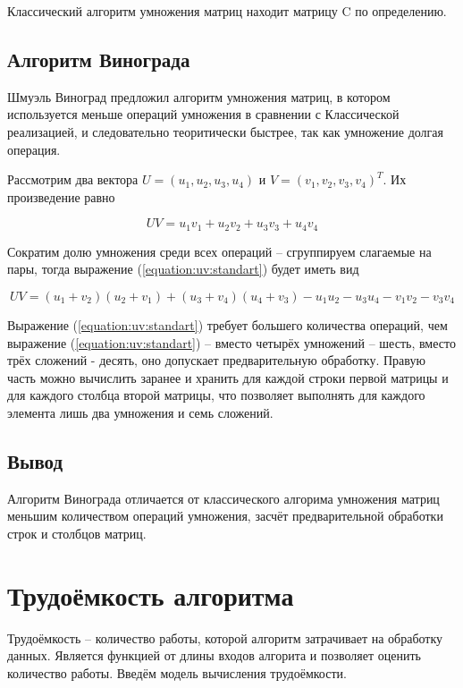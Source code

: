         Классический алгоритм умножения матриц находит матрицу C по определению.

        \subsection{Алгоритм Винограда}
        Шмуэль Виноград предложил алгоритм умножения матриц, в котором используется меньше операций умножения
        в сравнении с Классической реализацией, и следовательно теоритически быстрее, так как умножение долгая операция.

        Рассмотрим два вектора $ U = (u_1, u_2, u_3, u_4) $ и $ V = (v_1, v_2, v_3, v_4)^T $. Их произведение равно 

        \begin{equation}
            UV = u_1v_1 + u_2v_2 + u_3v_3 + u_4v_4
            \label{equation:uv:standart}
        \end{equation}

        Сократим долю умножения среди всех операций -- сгруппируем слагаемые на пары, тогда выражение (\ref{equation:uv:standart}) будет иметь вид

        \begin{equation}
            UV = (u_1 + v_2)(u_2 + v_1) + (u_3 + v_4)(u_4 + v_3) - u_1u_2 - u_3u_4 - v_1v_2 - v_3v_4
            \label{equation:uv:vinograd}
        \end{equation}

        Выражение (\ref{equation:uv:standart}) требует большего количества операций, чем  выражение (\ref{equation:uv:standart}) -- вместо четырёх
        умножений -- шесть, вместо трёх сложений - десять, оно  допускает предварительную обработку. Правую часть можно вычислить заранее и хранить
        для каждой строки первой матрицы и для каждого столбца второй матрицы, что позволяет выполнять для каждого элемента лишь два умножения и семь
        сложений.
        
        \subsection{Вывод}
            Алгоритм Винограда отличается от классического алгорима умножения матриц меньшим количеством операций умножения, 
            засчёт предварительной обработки строк и столбцов матриц. 

    \section{Трудоёмкость алгоритма}
        Трудоёмкость -- количество работы, которой алгоритм затрачивает на обработку данных.
        Является функцией от длины входов алгорита и позволяет оценить количество работы.
        Введём модель вычисления трудоёмкости.

